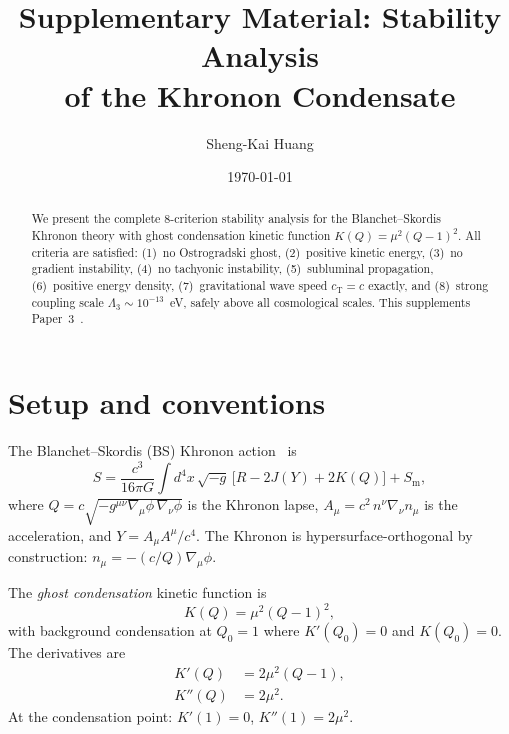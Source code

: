 \documentclass[prd,twocolumn,superscriptaddress,longbibliography,floatfix]{revtex4-2}
\newcommand{\cT}{c_{\mathrm{T}}}
\begin{document}
\title{Supplementary Material: Stability Analysis\\
of the Khronon Condensate}

\author{Sheng-Kai Huang}

\date{\today}

\begin{abstract}
We present the complete 8-criterion stability analysis for the
Blanchet--Skordis Khronon theory with ghost condensation kinetic
function $K(Q) = \mu^2(Q-1)^2$.  All criteria are satisfied:
(1)~no Ostrogradski ghost, (2)~positive kinetic energy,
(3)~no gradient instability, (4)~no tachyonic instability,
(5)~subluminal propagation, (6)~positive energy density,
(7)~gravitational wave speed $\cT = c$ exactly, and
(8)~strong coupling scale $\Lambda_3 \sim 10^{-13}$~eV,
safely above all cosmological scales.  This supplements
Paper~3~\cite{Paper3}.
\end{abstract}

\maketitle


\section{Setup and conventions}
\label{sec:setup}

The Blanchet--Skordis (BS) Khronon action~\cite{BS2024,BS2025} is
\begin{equation}
S = \frac{c^3}{16\pi G}\int\!d^4x\,\sqrt{-g}\,
\big[R - 2J(Y) + 2K(Q)\big] + S_{\mathrm{m}},
\label{eq:action}
\end{equation}
where $Q = c\sqrt{-g^{\mu\nu}\nabla_\mu\phi\,\nabla_\nu\phi}$
is the Khronon lapse, $A_\mu = c^2\,n^\nu\nabla_\nu n_\mu$ is
the acceleration, and $Y = A_\mu A^\mu / c^4$.  The Khronon
is hypersurface-orthogonal by construction: $n_\mu = -(c/Q)\nabla_\mu\phi$.

The \emph{ghost condensation} kinetic function is
\begin{equation}
K(Q) = \mu^2(Q - 1)^2,
\label{eq:KQ}
\end{equation}
with background condensation at $Q_0 = 1$ where $K'(Q_0) = 0$ and
$K(Q_0) = 0$.  The derivatives are
\begin{align}
K'(Q) &= 2\mu^2(Q - 1), \label{eq:Kp}\\
K''(Q) &= 2\mu^2. \label{eq:Kpp}
\end{align}
At the condensation point: $K'(1) = 0$, $K''(1) = 2\mu^2$.
\end{document}
